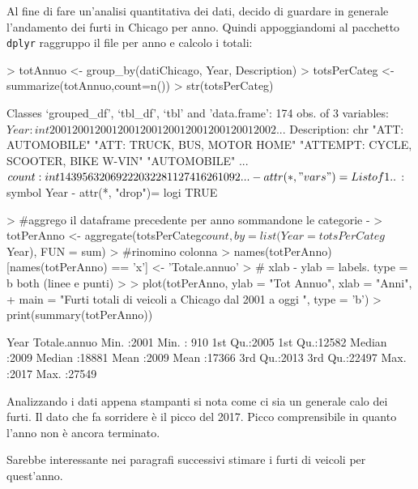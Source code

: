 \documentclass{article}
\begin{document}
Al fine di fare un'analisi quantitativa dei dati, decido di guardare in generale l'andamento dei furti in Chicago per anno.
Quindi appoggiandomi al pacchetto \texttt{dplyr} raggruppo il file per anno e calcolo i totali:

\begin{Schunk}
\begin{Sinput}
> totAnnuo <- group_by(datiChicago, Year, Description)
> totsPerCateg <- summarize(totAnnuo,count=n())
> str(totsPerCateg)
\end{Sinput}
\begin{Soutput}
Classes ‘grouped_df’, ‘tbl_df’, ‘tbl’ and 'data.frame':	174 obs. of  3 variables:
 $ Year       : int  2001 2001 2001 2001 2001 2001 2001 2001 2001 2002 ...
 $ Description: chr  "ATT: AUTOMOBILE" "ATT: TRUCK, BUS, MOTOR HOME" "ATTEMPT: CYCLE, SCOOTER, BIKE W-VIN" "AUTOMOBILE" ...
 $ count      : int  1439 56 3 20692 220 3228 11 274 1626 1092 ...
 - attr(*, "vars")=List of 1
  ..$ : symbol Year
 - attr(*, "drop")= logi TRUE
\end{Soutput}
\begin{Sinput}
> #aggrego il dataframe precedente per anno sommandone le categorie - 
> totPerAnno <- aggregate(totsPerCateg$count, by = list(Year=totsPerCateg$Year), FUN = sum)
> #rinomino colonna 
> names(totPerAnno)[names(totPerAnno) == 'x'] <- 'Totale.annuo'
> # xlab - ylab = labels. type = b both (linee e punti)
> 
> plot(totPerAnno, ylab = "Tot Annuo", xlab = "Anni", 
+      main = "Furti totali di veicoli a Chicago dal 2001 a oggi ", type = 'b')
> print(summary(totPerAnno))
\end{Sinput}
\begin{Soutput}
      Year       Totale.annuo  
 Min.   :2001   Min.   :  910  
 1st Qu.:2005   1st Qu.:12582  
 Median :2009   Median :18881  
 Mean   :2009   Mean   :17366  
 3rd Qu.:2013   3rd Qu.:22497  
 Max.   :2017   Max.   :27549  
\end{Soutput}
\end{Schunk}
Analizzando i dati appena stampanti si nota come ci sia un generale calo dei furti. Il dato che fa sorridere è il picco del 2017. Picco comprensibile in quanto l'anno non è ancora terminato. 

Sarebbe interessante nei paragrafi successivi stimare i furti di veicoli per quest'anno.
\end{document}
